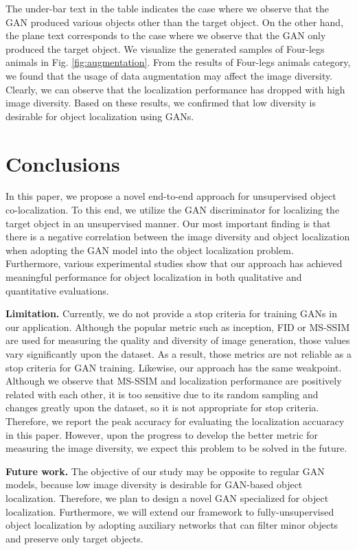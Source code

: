 \documentclass[runningheads]{llncs}
\begin{document}
The under-bar text in the table indicates the case where we observe that the GAN produced various objects other than the target object. On the other hand, the plane text corresponds to the case where we observe that the GAN only produced the target object. We visualize the generated samples of Four-legs animals in Fig. \ref{fig:augmentation}. From the results of Four-legs animals category, we found that the usage of data augmentation may affect the image diversity. Clearly, we can observe that the localization performance has dropped with high image diversity. Based on these results, we confirmed that low diversity is desirable for object localization using GANs.


\section{Conclusions}
\label{sec:conclusions}

In this paper, we propose a novel end-to-end approach for unsupervised object co-localization. To this end, we utilize the GAN discriminator for localizing the target object in an unsupervised manner. Our most important finding is that there is a negative correlation between the image diversity and object localization when adopting the GAN model into the object localization problem. Furthermore, various experimental studies show that our approach has achieved meaningful performance for object localization in both qualitative and quantitative evaluations. 

\noindent\textbf{Limitation.} Currently, we do not provide a stop criteria for training GANs in our application. Although the popular metric such as inception, FID or MS-SSIM are used for measuring the quality and diversity of image generation, those values vary significantly upon the dataset. As a result, those metrics are not reliable as a stop criteria for GAN training. Likewise, our approach has the same weakpoint. Although we observe that MS-SSIM \cite{odena2016conditional} and localization performance are positively related with each other, it is too sensitive due to its random sampling and changes greatly upon the dataset, so it is not appropriate for stop criteria. Therefore, we report the peak accuracy for evaluating the localization accuaracy in this paper. However, upon the progress to develop the better metric for measuring the image diversity, we expect this problem to be solved in the future.

\noindent\textbf{Future work.} The objective of our study may be opposite to regular GAN models, because low image diversity is desirable for GAN-based object localization. Therefore, we plan to design a novel GAN specialized for object localization. Furthermore, we will extend our framework to fully-unsupervised object localization by adopting auxiliary networks that can filter minor objects and preserve only target objects.
\end{document}
